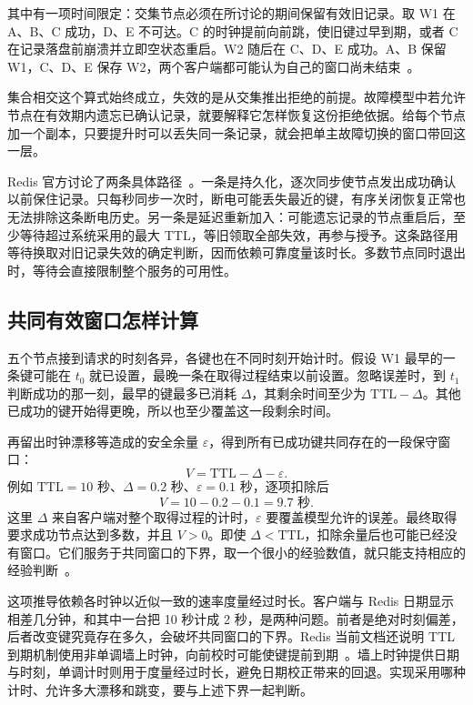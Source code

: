 其中有一项时间限定：交集节点必须在所讨论的期间保留有效旧记录。取 W1 在 A、B、C 成功，D、E 不可达。C 的时钟提前向前跳，使旧键过早到期，或者 C 在记录落盘前崩溃并立即空状态重启。W2 随后在 C、D、E 成功。A、B 保留 W1，C、D、E 保存 W2，两个客户端都可能认为自己的窗口尚未结束~\cite{kleppmann-locking}。


集合相交这个算式始终成立，失效的是从交集推出拒绝的前提。故障模型中若允许节点在有效期内遗忘已确认记录，就要解释它怎样恢复这份拒绝依据。给每个节点加一个副本，只要提升时可以丢失同一条记录，就会把单主故障切换的窗口带回这一层。

Redis 官方讨论了两条具体路径~\cite{redis-redlock}。一条是持久化，逐次同步使节点发出成功确认以前保住记录。只每秒同步一次时，断电可能丢失最近的键，有序关闭恢复正常也无法排除这条断电历史。另一条是延迟重新加入：可能遗忘记录的节点重启后，至少等待超过系统采用的最大 TTL，等旧领取全部失效，再参与授予。这条路径用等待换取对旧记录失效的确定判断，因而依赖可靠度量该时长。多数节点同时退出时，等待会直接限制整个服务的可用性。

\subsection*{共同有效窗口怎样计算}

五个节点接到请求的时刻各异，各键也在不同时刻开始计时。假设 W1 最早的一条键可能在 \(t_0\) 就已设置，最晚一条在取得过程结束以前设置。忽略误差时，到 \(t_1\) 判断成功的那一刻，最早的键最多已消耗 \(\Delta\)，其剩余时间至少为 \(\mathrm{TTL}-\Delta\)。其他已成功的键开始得更晚，所以也至少覆盖这一段剩余时间。

再留出时钟漂移等造成的安全余量 \(\varepsilon\)，得到所有已成功键共同存在的一段保守窗口：
\[
 V=\mathrm{TTL}-\Delta-\varepsilon.
\]
例如 \(\mathrm{TTL}=10\) 秒、\(\Delta=0.2\) 秒、\(\varepsilon=0.1\) 秒，逐项扣除后
\[
 V=10-0.2-0.1=9.7\text{ 秒}.
\]
这里 \(\Delta\) 来自客户端对整个取得过程的计时，\(\varepsilon\) 要覆盖模型允许的误差。最终取得要求成功节点达到多数，并且 \(V>0\)。即使 \(\Delta<\mathrm{TTL}\)，扣除余量后也可能已经没有窗口。它们服务于共同窗口的下界，取一个很小的经验数值，就只能支持相应的经验判断~\cite{redis-redlock}。


这项推导依赖各时钟以近似一致的速率度量经过时长。客户端与 Redis 日期显示相差几分钟，和其中一台把 10 秒计成 2 秒，是两种问题。前者是绝对时刻偏差，后者改变键究竟存在多久，会破坏共同窗口的下界。Redis 当前文档还说明 TTL 到期机制使用非单调墙上时钟，向前校时可能使键提前到期~\cite{redis-redlock}。墙上时钟提供日期与时刻，单调计时则用于度量经过时长，避免日期校正带来的回退。实现采用哪种计时、允许多大漂移和跳变，要与上述下界一起判断。

